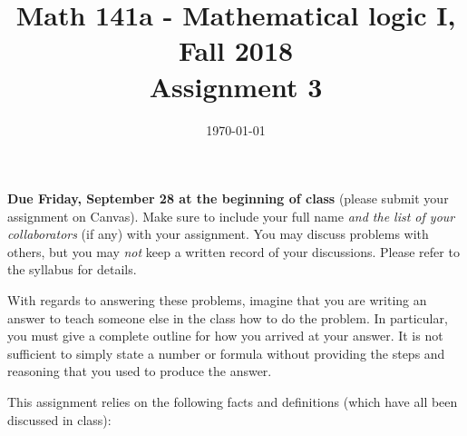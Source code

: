 \documentclass{amsart}
\title[Math 141a, Fall 2018: assignment 3]{Math 141a - Mathematical logic I, Fall 2018 \\ Assignment 3}
\date{\today}
\theoremstyle{definition}
\begin{document}

\maketitle

\textbf{Due Friday, September 28 at the beginning of class} (please submit your assignment on Canvas). Make sure to include your full name \emph{and the list of your collaborators} (if any) with your assignment. You may discuss problems with others, but you may \emph{not} keep a written record of your discussions. Please refer to the syllabus for details.

With regards to answering these problems, imagine that you are writing an answer to teach someone else in the class how to do the problem. In particular, you must give a complete outline for how you arrived at your answer. It is not sufficient to simply state a number or formula without providing the steps and reasoning that you used to produce the answer.

This assignment relies on the following facts and definitions (which have all been discussed in class):
\end{document}
